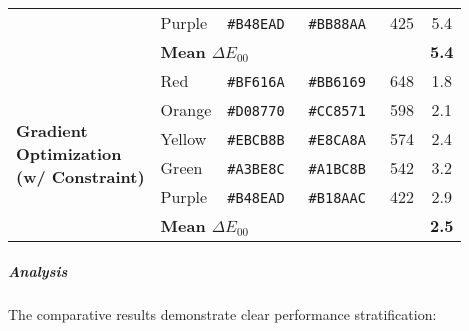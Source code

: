 \documentclass[12pt,a4paper]{article}
\newcommand{\deltaE}{\Delta E_{00}}
\newcommand{\hexcolour}[1]{%
  \definecolor{tempcolour}{HTML}{#1}%
  \texttt{\##1}~\raisebox{0.2ex}{\fboxsep=0pt\fbox{\colorbox{tempcolour}{\phantom{XX}}}}%
}
\begin{document}
\begin{table}[H]
\begin{tabular}{llcccc}
& Purple & \hexcolour{B48EAD} & \hexcolour{BB88AA} & 425 & 5.4 \\
\cmidrule{2-6}
& \multicolumn{4}{l}{\textbf{Mean $\deltaE$}} & \textbf{5.4} \\
\midrule
\multirow{6}{*}{\parbox{2.2cm}{\textbf{Gradient}\\\textbf{Optimization}\\\textbf{(w/ Constraint)}}} 
& Red & \hexcolour{BF616A} & \hexcolour{BB6169} & 648 & 1.8 \\
& Orange & \hexcolour{D08770} & \hexcolour{CC8571} & 598 & 2.1 \\
& Yellow & \hexcolour{EBCB8B} & \hexcolour{E8CA8A} & 574 & 2.4 \\
& Green & \hexcolour{A3BE8C} & \hexcolour{A1BC8B} & 542 & 3.2 \\
& Purple & \hexcolour{B48EAD} & \hexcolour{B18AAC} & 422 & 2.9 \\
\cmidrule{2-6}
& \multicolumn{4}{l}{\textbf{Mean $\deltaE$}} & \textbf{2.5} \\
\bottomrule
\end{tabular}
\end{table}

\subparagraph{Analysis}

The comparative results demonstrate clear performance stratification:
\end{document}
